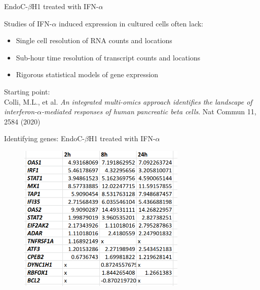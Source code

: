 \documentclass{beamer}					%
\begin{document}
\begin{frame}{EndoC-$\beta$H1 treated with IFN-$\alpha$}

Studies of IFN-$\alpha$ induced expression in cultured cells often lack:
\vspace{0.2in}

\begin{itemize}
\item Single cell resolution of RNA counts and locations
\item Sub-hour time resolution of transcript counts and locations
\item Rigorous statistical models of gene expression
\end{itemize}
\vspace{0.2in}
Starting point:\\
\vspace{0.2in}
Colli, M.L., et al. \textit{An integrated multi-omics approach identifies the landscape of interferon-$\alpha$-mediated responses of human pancreatic beta cells}. Nat Commun 11, 2584 (2020)

\end{frame}

\begin{frame}{Identifying genes: EndoC-$\beta$H1 treated with IFN-$\alpha$}


\begin{figure}
\includegraphics[width=8cm]{fold-change.png}
\end{figure}

\end{frame}
\end{document}
